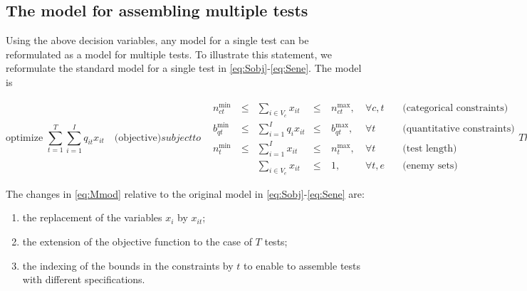 \subsection{The model for assembling multiple tests}
Using the above decision variables, any model for a single test can be reformulated as a model for multiple tests. To illustrate this statement, we reformulate the standard model for a single test in \eqref{eq:Sobj}-\eqref{eq:Sene}. The model is

\begin{subequations}
	\begin{equation}\label{eq:Mobj}
	\mbox{optimize } \sum_{t=1}^T{\sum_{i=1}^I q_{it} x_{it}} \quad \mbox{(objective)}
	\end{equation}
	subject to	
	\begin{alignat}{4}
	\label{eq:Mcat}
	&n^{\min}_{ct} \ &\le & \sum_{i \in V_c} x_{it} &\le \ & n^{\max}_{ct}, \ &\forall c,t  \quad & \mbox{(categorical constraints)}\\
	\label{eq:Mquan}
	&b^{\min}_{qt} \ &\le & \sum_{i=1}^I q_i x_{it} &\le \ & b^{\max}_{qt}, \ & \forall t   \quad & \mbox{(quantitative constraints)}\\
	\label{eq:Mlen}
	&n^{\min}_t    \ &\leq& \sum_{i=1}^I x_{it}    &\le \ & n^{\max}_t, \     & \forall t   \quad &\mbox{(test length)}\\
	\label{eq:Mene}
	&              &    & \sum_{i \in V_e} x_{it}&\le \ & 1,          \     & \forall t,e \quad &\mbox{(enemy sets)}
	\end{alignat}
	
	Then, definition of variables
	
	\begin{equation*}\label{eq:MDV2}
	x_{it} \in \{0,1\}, \ \forall i,t \quad \mbox{(decision variables)}
	\end{equation*}
	\label{eq:Mmod}
\end{subequations}

The changes in \eqref{eq:Mmod} relative to the original model in \eqref{eq:Sobj}-\eqref{eq:Sene} are:
\begin{enumerate}
	\item the replacement of the variables $x_i$ by $x_{it}$;
	\item the extension of the objective function to the case of $T$ tests;
	\item the indexing of the bounds in the constraints by $t$ to enable to assemble tests with different specifications.
\end{enumerate}

